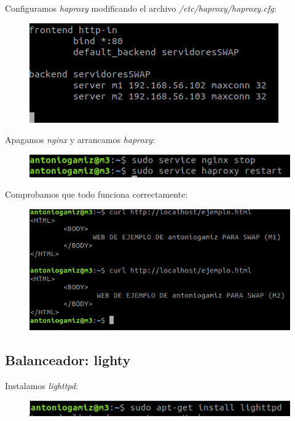 \documentclass[12pt]{article}
\begin{document}
Configuramos \textit{haproxy} modificando el archivo \textit{/etc/haproxy/haproxy.cfg}:

\begin{figure}[H]
\center
\includegraphics[scale=0.5]{13.png}
\end{figure}

Apagamos \textit{nginx} y arrancamos \textit{haproxy}:

\begin{figure}[H]
\center
\includegraphics[scale=0.5]{14.png}
\end{figure}

Comprobamos que todo funciona correctamente:

\begin{figure}[H]
\center
\includegraphics[scale=0.5]{15.png}
\end{figure}

\subsection{Balanceador: lighty }

Instalamos \textit{lighttpd}:

\begin{figure}[H]
\center
\includegraphics[scale=0.5]{25.png}
\end{figure}
\end{document}
